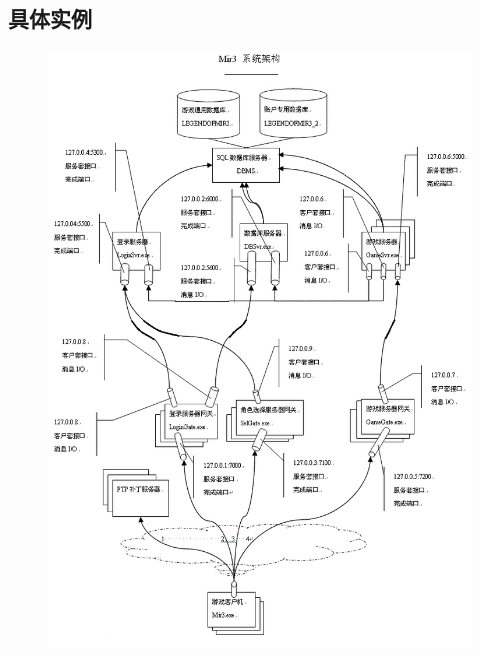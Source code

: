 \documentclass[UTF8,a4paper,8pt]{ctexart}
\begin{document}
	\subsection{具体实例}
	\begin{figure}[h] 	
		\centering
		\includegraphics[width=14cm,clip]{gameServer14.png} 	
		\label{fig:gameServer14}
	\end{figure} 
\end{document}

